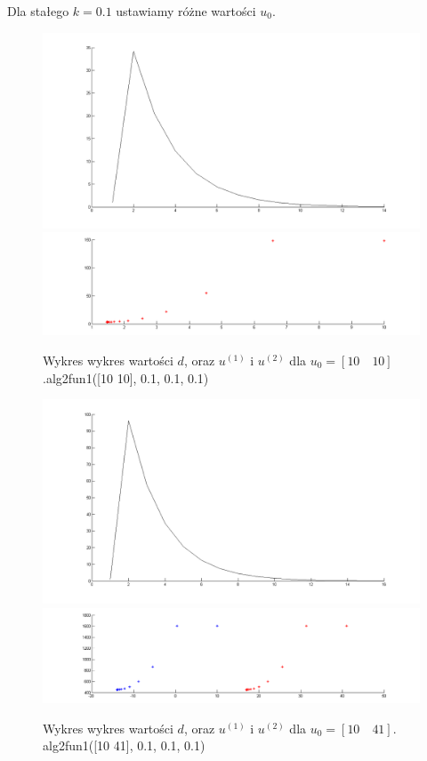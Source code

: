 \documentclass[a4paper,10pt]{article}
\begin{document}
\newpage Dla stałego $k=0.1$ ustawiamy różne wartości $u_0$.
\begin{figure}[!h]
    \centering
	\includegraphics[width=120mm]{CW4-alg2fun1-u10_10-k01-d.png}
	\includegraphics[width=120mm]{CW4-alg2fun1-u10_10-k01-u.png}
	\caption{Wykres wykres wartości $d$, oraz $u^{(1)}$ i $u^{(2)}$ dla $u_0=[10 \quad 10]$.\newline \small alg2fun1([10 10], 0.1, 0.1, 0.1) }
    \label{fig:Rysunek}
\end{figure}
\begin{figure}[!h]
    \centering
	\includegraphics[width=120mm]{CW4-alg2fun1-u10_41-k01-d.png}
	\includegraphics[width=120mm]{CW4-alg2fun1-u10_41-k01-u.png}
	\caption{Wykres wykres wartości $d$, oraz $u^{(1)}$ i $u^{(2)}$ dla $u_0=[10 \quad 41]$. \newline \small alg2fun1([10 41], 0.1, 0.1, 0.1)}
    \label{fig:Rysunek}
\end{figure}
\end{document}
